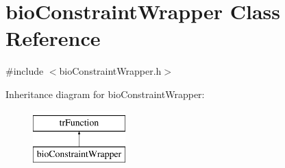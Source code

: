\hypertarget{classbio_constraint_wrapper}{}\section{bio\+Constraint\+Wrapper Class Reference}
\label{classbio_constraint_wrapper}


{\ttfamily \#include $<$bio\+Constraint\+Wrapper.\+h$>$}

Inheritance diagram for bio\+Constraint\+Wrapper\+:\begin{figure}[H]
\begin{center}
\leavevmode
\includegraphics[height=2.000000cm]{classbio_constraint_wrapper}
\end{center}
\end{figure}
